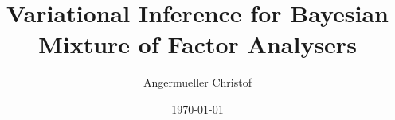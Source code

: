 \documentclass[a4paper]{article}
\author{Angermueller Christof}
\date{\today}
\title{Variational Inference for Bayesian Mixture of Factor Analysers}
\begin{document}
\maketitle

\newcommand{\bs}{\boldsymbol}
\newcommand{\Xp}{\bs{\pi}}
\newcommand{\Xbl}{\bar{\Lambda^s}}
\newcommand{\Xn}{\bs{\nu}^s}
\newcommand{\Xe}{\Psi}
\newcommand{\Xa}{\alpha}
\newcommand{\Xc}{\Xl{\Xl}^T}

\newcommand{\Xl}{\Lambda^s}
\newcommand{\Xlmp}{\bar{\bs{\Lambda}}^s_p}
\newcommand{\Xlvp}{\Sigma^{p,s}}
\newcommand{\Xlvpi}{\Xlvp{}^{-1}}
\newcommand{\Xlvpll}{\Xlvp_{\Lambda\Lambda}}
\newcommand{\Xlvplu}{\Xlvp_{\Lambda\mu}}
\newcommand{\Xlvpul}{\Xlvp_{\mu\Lambda}}
\newcommand{\Xlvpuu}{\Xlvp_{\mu\mu}}
\newcommand{\Xlvplli}{\Xlvpll{}^{-1}}
\newcommand{\Xlvplui}{\Xlvplu{}^{-1}}
\newcommand{\Xlvpuli}{\Xlvpul{}^{-1}}
\newcommand{\Xlvpuui}{\Xlvpuu{}^{-1}}
\newcommand{\Xlt}{\tilde{\Lambda}^s}
\newcommand{\Xltb}{\tilde{{\bs{\Lambda}}}^s}
\newcommand{\Xltp}{\tilde{\bs{\Lambda}}^s_p}
\newcommand{\Xltpq}{\tilde{\Lambda}^s_{pq}}
\newcommand{\Xltm}{\bar{\tilde{\Lambda}}^s}
\newcommand{\Xltmp}{\bar{\tilde{\bs{\Lambda}}}^s_p}
\newcommand{\Xltmpq}{\bar{\tilde{\Lambda}}^s_{pq}}
\newcommand{\Xltvp}{\tilde{\Gamma}^{p,s}}
\newcommand{\Xltvpi}{\Xltvp{}^{-1}}

\newcommand{\Xu}{\bs{\mu}^s}
\newcommand{\Xup}{\mu^s_p}
\newcommand{\Xum}{\bar{\bs{\mu}}^s}
\newcommand{\Xump}{\bar{\mu}^s_p}

\newcommand{\Xx}{\bs{x}^n}
\newcommand{\Xxm}{\overline{\bs{x}}^{n,s}}
\newcommand{\Xxv}{\Sigma^s}
\newcommand{\Xxt}{\tilde{\bs{x}}^n}
\newcommand{\Xxtq}{\tilde{x}^n_q}
\newcommand{\Xxtm}{\bar{\tilde{\bs{x}}}^n}
\newcommand{\Xxtmq}{\bar{\tilde{x}}^n_q}
\newcommand{\Xxtv}{\tilde{\Sigma}^s}

\newcommand{\Xsp}{\Sigma^{p,s}}
\newcommand{\Xxs}{\Sigma^s}
\newcommand{\Xlm}{\overline{\Lambda}^s}
\newcommand{\Xls}{\Sigma^{p,s}}
\newcommand{\Xpsii}{\Psi^{-1}}
\newcommand{\Xy}{\bs{y}^n}
\newcommand{\Xs}{s^n}
\newcommand{\Xcov}{\operatorname{cov}}
\newcommand{\Xvar}{\operatorname{var}}
\newcommand{\Xtr}{\operatorname{tr}}
\newcommand{\Xdiag}{\operatorname{diag}}
\newcommand{\Xvec}{\operatorname{vec}}
\end{document}
